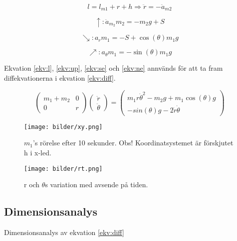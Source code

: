 \documentclass[a4paper,12pt]{article}
\begin{document}
\begin{equation}
l=l_{m1}+r+h \Rightarrow \ddot{r}=-\ddot{a}_{m2}
\label{ekv:l}
\end{equation}

\begin{equation}
\uparrow: \ddot{a}_{m_2}m_2=-m_2 g+S
\label{ekv:up}
\end{equation}

\begin{equation}
\searrow: a_rm_1=-S+\cos(\theta)m_1 g
\label{ekv:se}
\end{equation}

\begin{equation}
\nearrow: a_\theta m_1=-\sin(\theta)m_1 g
\label{ekv:ne}
\end{equation}

Ekvation \ref{ekv:l}, \ref{ekv:up}, \ref{ekv:se} och \ref{ekv:ne} annvänds för att ta fram diffekvationerna i ekvation \ref{ekv:diff}.

\begin{equation}
\begin{pmatrix}
m_1+m_2& 0 \\
0&       r  
\end{pmatrix}
\begin{pmatrix}
\ddot{r} \\
\ddot{\theta}  
\end{pmatrix}
=
\begin{pmatrix}
m_1r\dot{\theta}^2-m_2g+m_1\cos(\theta)g\\
-sin(\theta)g-2\dot{r}\dot{\theta}
\end{pmatrix}
\label{ekv:diff}
\end{equation}

\begin{figure}[!ht]
\centering
\texttt{[image: bilder/xy.png]}
\caption{$m_1$'s rörelse efter 10 sekunder. Obs! Koordinatsystemet är förskjutet h i x-led.}  
\label{fig:xy}
\end{figure}

\begin{figure}[!ht]
\centering
\texttt{[image: bilder/rt.png]}
\caption{r och $\theta$s variation med avsende på tiden.}
\label{fig:rt}
\end{figure}

\subsection*{Dimensionsanalys}
Dimensionsanalys av ekvation \ref{ekv:diff}
\end{document}
